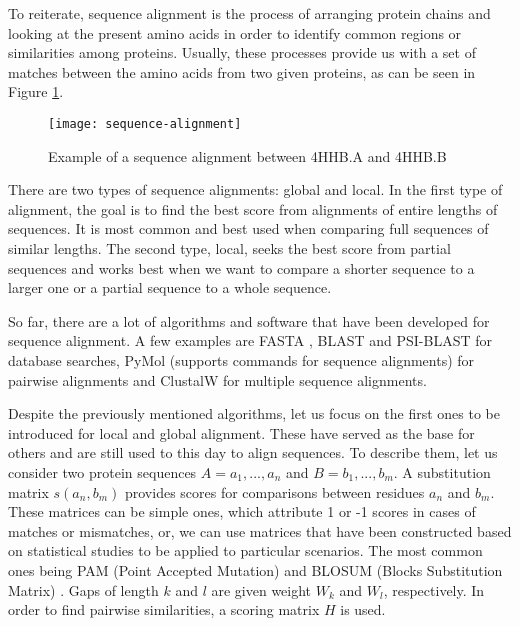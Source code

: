 To reiterate, sequence alignment is the process of arranging protein chains and looking at the present amino acids in order to identify common regions or similarities among proteins. Usually, these processes provide us with a set of matches between the amino acids from two given proteins, as can be seen in Figure \ref{fig:sequencealignment}. 

\begin{figure}[htbp]
	\centering
	\texttt{[image: sequence-alignment]}
	\caption{Example of a sequence alignment between 4HHB.A and 4HHB.B}
	\label{fig:sequencealignment}
\end{figure}

There are two types of sequence alignments: global and local. In the first type of alignment, the goal is to find the best score from alignments of entire lengths of sequences. It is most common and best used when comparing full sequences of similar lengths. The second type, local, seeks the best score from partial sequences and works best when we want to compare a shorter sequence to a larger one or a partial sequence to a whole sequence.

So far, there are a lot of algorithms and software that have been developed for sequence alignment. A few examples are FASTA \cite{lipman1985rapid}, BLAST \cite{altschul1990basic} and PSI-BLAST \cite{altschul1997gapped} for database searches, PyMol \cite{delano2002pymol} (supports commands for sequence alignments) for pairwise alignments and ClustalW \cite{chenna2003multiple} for multiple sequence alignments.

Despite the previously mentioned algorithms, let us focus on the first ones to be introduced for local and global alignment. These have served as the base for others and are still used to this day to align sequences. To describe them, let us consider two protein sequences $A = a_{1},...,a_{n}$ and $B = b_{1},...,b_{m}$. A substitution matrix $s(a_{n},b_{m})$ provides scores for comparisons between residues $a_{n}$ and $b_{m}$. These matrices can be simple ones, which attribute 1 or -1 scores in cases of matches or mismatches, or, we can use matrices that have been constructed based on statistical studies to be applied to particular scenarios. The most common ones being PAM (Point Accepted Mutation) \cite{dayhoff197822} and BLOSUM (Blocks Substitution Matrix) \cite{henikoff1992amino}. Gaps of length $k$ and $l$ are given weight $W_{k}$ and $W_{l}$, respectively. In order to find pairwise similarities, a scoring matrix $ H $ is used. 

